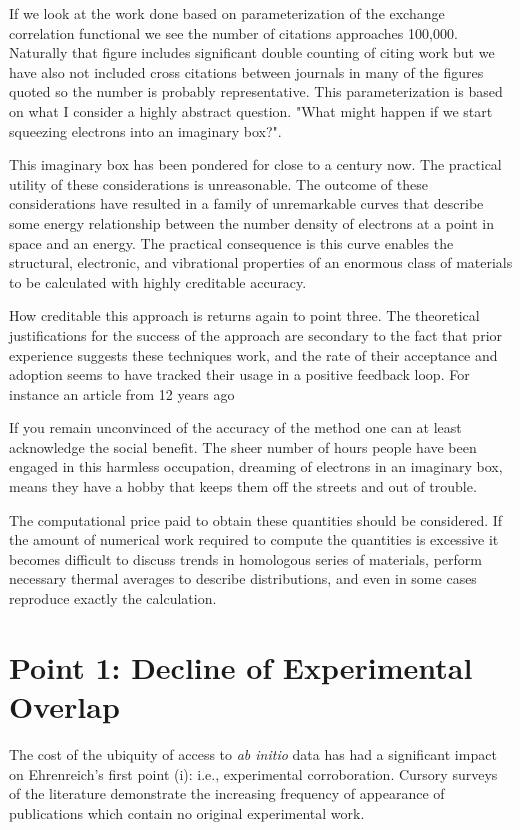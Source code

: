 If we look at the work done based on parameterization of the exchange correlation functional we see the number of citations approaches 100,000. 
Naturally that figure includes significant double counting of citing work but we have also not included cross citations between journals in many of the 
figures quoted so the number is probably representative. This parameterization is based on what I consider a highly abstract question.
"What might happen if we start squeezing electrons into an imaginary box?".

This imaginary box has been pondered for close to a century now. The practical utility of these considerations is unreasonable. 
The outcome of these considerations have resulted in a family of unremarkable curves that describe some energy relationship between
the number density of electrons at a point in space and an energy. The practical consequence is this curve enables the
structural, electronic, and vibrational properties of an enormous class of materials to be calculated with highly creditable accuracy.

How creditable this approach is returns again to point three. The theoretical justifications for the success of the approach are
secondary to the fact that prior experience suggests these techniques work, and the rate of their acceptance and adoption
seems to have tracked their usage in a positive feedback loop. For instance an article from 12 years ago 

If you remain unconvinced of the accuracy of the method one can at least acknowledge the social benefit. 
The sheer number of hours people have been engaged in this harmless occupation, dreaming of 
electrons in an imaginary box, means they have a hobby that keeps them off the streets and out of trouble.


The computational price paid to obtain these quantities should be considered. If the amount of numerical
work required to compute the quantities is excessive it becomes difficult to discuss trends in homologous series of materials, perform
necessary thermal averages to describe distributions, and even in some cases reproduce exactly the calculation.

\section{Point 1: Decline of Experimental Overlap}
The cost of the ubiquity of access to {\it ab initio} data has had a significant impact on 
Ehrenreich's first point (i): i.e., experimental corroboration. Cursory surveys of the literature 
demonstrate the increasing frequency of appearance of publications which contain no 
original experimental work. 


